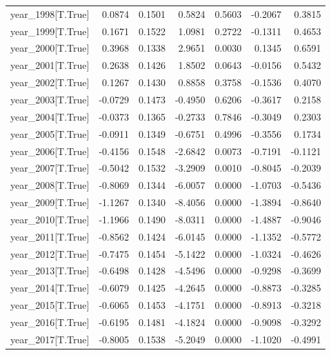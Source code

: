 \begin{table}
\begin{center}
\begin{tabular}{lrrrrrr}
year\_1998[T.True]       &  0.0874 &   0.1501 &   0.5824 &      0.5603 & -0.2067 &  0.3815  \\
year\_1999[T.True]       &  0.1671 &   0.1522 &   1.0981 &      0.2722 & -0.1311 &  0.4653  \\
year\_2000[T.True]       &  0.3968 &   0.1338 &   2.9651 &      0.0030 &  0.1345 &  0.6591  \\
year\_2001[T.True]       &  0.2638 &   0.1426 &   1.8502 &      0.0643 & -0.0156 &  0.5432  \\
year\_2002[T.True]       &  0.1267 &   0.1430 &   0.8858 &      0.3758 & -0.1536 &  0.4070  \\
year\_2003[T.True]       & -0.0729 &   0.1473 &  -0.4950 &      0.6206 & -0.3617 &  0.2158  \\
year\_2004[T.True]       & -0.0373 &   0.1365 &  -0.2733 &      0.7846 & -0.3049 &  0.2303  \\
year\_2005[T.True]       & -0.0911 &   0.1349 &  -0.6751 &      0.4996 & -0.3556 &  0.1734  \\
year\_2006[T.True]       & -0.4156 &   0.1548 &  -2.6842 &      0.0073 & -0.7191 & -0.1121  \\
year\_2007[T.True]       & -0.5042 &   0.1532 &  -3.2909 &      0.0010 & -0.8045 & -0.2039  \\
year\_2008[T.True]       & -0.8069 &   0.1344 &  -6.0057 &      0.0000 & -1.0703 & -0.5436  \\
year\_2009[T.True]       & -1.1267 &   0.1340 &  -8.4056 &      0.0000 & -1.3894 & -0.8640  \\
year\_2010[T.True]       & -1.1966 &   0.1490 &  -8.0311 &      0.0000 & -1.4887 & -0.9046  \\
year\_2011[T.True]       & -0.8562 &   0.1424 &  -6.0145 &      0.0000 & -1.1352 & -0.5772  \\
year\_2012[T.True]       & -0.7475 &   0.1454 &  -5.1422 &      0.0000 & -1.0324 & -0.4626  \\
year\_2013[T.True]       & -0.6498 &   0.1428 &  -4.5496 &      0.0000 & -0.9298 & -0.3699  \\
year\_2014[T.True]       & -0.6079 &   0.1425 &  -4.2645 &      0.0000 & -0.8873 & -0.3285  \\
year\_2015[T.True]       & -0.6065 &   0.1453 &  -4.1751 &      0.0000 & -0.8913 & -0.3218  \\
year\_2016[T.True]       & -0.6195 &   0.1481 &  -4.1824 &      0.0000 & -0.9098 & -0.3292  \\
year\_2017[T.True]       & -0.8005 &   0.1538 &  -5.2049 &      0.0000 & -1.1020 & -0.4991  \\

\end{tabular}
\end{center}
\end{table}
